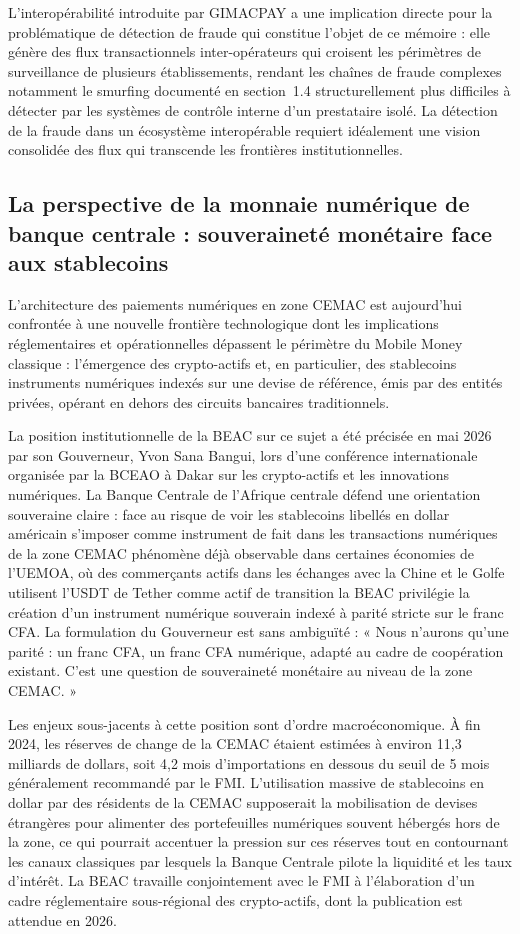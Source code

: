 \documentclass[11pt,a4paper,oneside]{report}
\theoremstyle{definition}
\theoremstyle{remark}
\begin{document}
L'interopérabilité introduite par GIMACPAY a une implication directe pour la problématique de détection de fraude qui constitue l'objet de ce mémoire : elle génère des flux transactionnels inter-opérateurs qui croisent les périmètres de surveillance de plusieurs établissements, rendant les chaînes de fraude complexes  notamment le smurfing documenté en section~1.4  structurellement plus difficiles à détecter par les systèmes de contrôle interne d'un prestataire isolé. La détection de la fraude dans un écosystème interopérable requiert idéalement une vision consolidée des flux qui transcende les frontières institutionnelles.

\subsection{La perspective de la monnaie numérique de banque centrale : souveraineté monétaire face aux stablecoins}

L'architecture des paiements numériques en zone CEMAC est aujourd'hui confrontée à une nouvelle frontière technologique dont les implications réglementaires et opérationnelles dépassent le périmètre du Mobile Money classique : l'émergence des crypto-actifs et, en particulier, des stablecoins  instruments numériques indexés sur une devise de référence, émis par des entités privées, opérant en dehors des circuits bancaires traditionnels.

La position institutionnelle de la BEAC sur ce sujet a été précisée en mai 2026 par son Gouverneur, Yvon Sana Bangui, lors d'une conférence internationale organisée par la BCEAO à Dakar sur les crypto-actifs et les innovations numériques. La Banque Centrale de l'Afrique centrale défend une orientation souveraine claire : face au risque de voir les stablecoins libellés en dollar américain s'imposer comme instrument de fait dans les transactions numériques de la zone CEMAC  phénomène déjà observable dans certaines économies de l'UEMOA, où des commerçants actifs dans les échanges avec la Chine et le Golfe utilisent l'USDT de Tether comme actif de transition  la BEAC privilégie la création d'un instrument numérique souverain indexé à parité stricte sur le franc CFA. La formulation du Gouverneur est sans ambiguïté : « Nous n'aurons qu'une parité : un franc CFA, un franc CFA numérique, adapté au cadre de coopération existant. C'est une question de souveraineté monétaire au niveau de la zone CEMAC. »

Les enjeux sous-jacents à cette position sont d'ordre macroéconomique. À fin 2024, les réserves de change de la CEMAC étaient estimées à environ 11,3 milliards de dollars, soit 4,2 mois d'importations  en dessous du seuil de 5 mois généralement recommandé par le FMI. L'utilisation massive de stablecoins en dollar par des résidents de la CEMAC supposerait la mobilisation de devises étrangères pour alimenter des portefeuilles numériques souvent hébergés hors de la zone, ce qui pourrait accentuer la pression sur ces réserves tout en contournant les canaux classiques par lesquels la Banque Centrale pilote la liquidité et les taux d'intérêt. La BEAC travaille conjointement avec le FMI à l'élaboration d'un cadre réglementaire sous-régional des crypto-actifs, dont la publication est attendue en 2026.
\end{document}
